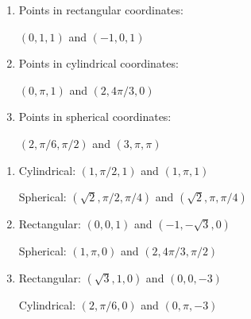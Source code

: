{
\begin{enumerate}
	\item Points in rectangular coordinates:

$(0,1,1)$ and $(-1,0,1)$

	\item Points in cylindrical coordinates:
	
	$(0,\pi,1)$ and $(2,4\pi/3,0)$
	
	\item Points in spherical coordinates:
	
	$(2,\pi/6,\pi/2)$ and $(3,\pi,\pi)$

\end{enumerate}
}
{\begin{enumerate}
	\item Cylindrical:	$(1,\pi/2,1)$ and $(1,\pi,1)$
		
		Spherical: $(\sqrt 2,\pi/2,\pi/4)$ and $(\sqrt{2}, \pi, \pi/4)$
	\item Rectangular: 	$(0,0,1)$ and $(-1,-\sqrt 3,0)$
	
	Spherical: $(1,\pi,0)$ and $(2,4\pi/3,\pi/2)$
	\item Rectangular:	$(\sqrt 3,1,0)$ and $(0,0,-3)$
	
	Cylindrical:	$(2,\pi/6,0)$ and $(0,\pi,-3)$
\end{enumerate}
}
